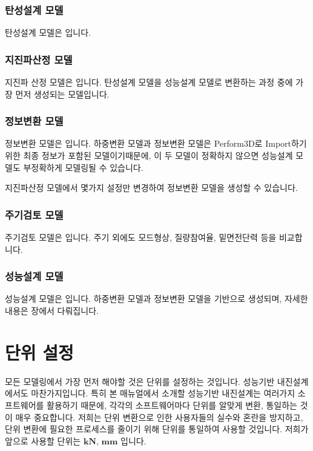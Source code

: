 \documentclass[a4paper,11pt,korean,openany,oneside]{sphinxmanual}
\begin{document}
\subsubsection*{탄성설계 모델}

\sphinxAtStartPar
탄성설계 모델은 입니다.
\subsubsection*{지진파산정 모델}

\sphinxAtStartPar
지진파 산정 모델은 입니다.
탄성설계 모델을 성능설계 모델로 변환하는 과정 중에 가장 먼저 생성되는 모델입니다.
\subsubsection*{정보변환 모델}

\sphinxAtStartPar
정보변환 모델은 입니다.
하중변환 모델과 정보변환 모델은 Perform\sphinxhyphen{}3D로 Import하기 위한 최종 정보가 포함된 모델이기때문에,
이 두 모델이 정확하지 않으면 성능설계 모델도 부정확하게 모델링될 수 있습니다.

\sphinxAtStartPar
지진파산정 모델에서 몇가지 설정만 변경하여 정보변환 모델을 생성할 수 있습니다.
\subsubsection*{주기검토 모델}

\sphinxAtStartPar
주기검토 모델은 입니다.
주기 외에도 모드형상, 질량참여율, 밑면전단력 등을 비교합니다.
\subsubsection*{성능설계 모델}

\sphinxAtStartPar
성능설계 모델은 입니다.
하중변환 모델과 정보변환 모델을 기반으로 생성되며, 자세한 내용은 {\hyperref[\detokenize{3_modelling::doc}]{}} 장에서 다뤄집니다.



\sphinxstepscope


\section{단위 설정}
\label{\detokenize{1_unit_setting:id1}}\label{\detokenize{1_unit_setting::doc}}
\sphinxAtStartPar
모든 모델링에서 가장 먼저 해야할 것은 단위를 설정하는 것입니다. 성능기반 내진설계에서도 마찬가지입니다.
특히 본 매뉴얼에서 소개할 성능기반 내진설계는 여러가지 소프트웨어를 활용하기 때문에, 각각의 소프트웨어마다 단위를 알맞게 변환, 통일하는 것이
매우 중요합니다. 저희는 단위 변환으로 인한 사용자들의 실수와 혼란을 방지하고, 단위 변환에 필요한 프로세스를 줄이기 위해 단위를 통일하여 사용할 것입니다.
저희가 앞으로 사용할 단위는 \(\textbf{kN, mm}\) 입니다.
\end{document}
